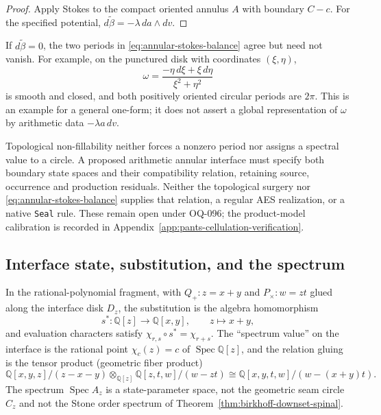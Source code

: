 \begin{proof}
Apply Stokes to the compact oriented annulus $A$ with boundary $C-c$.
For the specified potential, $d\widetilde\beta=-\lambda\,da\wedge dv$.
\end{proof}

\begin{remark}
\label{rem:annular-interface-open}
If $d\widetilde\beta=0$, the two periods in
\eqref{eq:annular-stokes-balance} agree but need not vanish.  For example, on
the punctured disk with coordinates $(\xi,\eta)$,
\[
 \omega=\frac{-\eta\,d\xi+\xi\,d\eta}{\xi^2+\eta^2}
\]
is smooth and closed, and both positively oriented circular periods are
$2\pi$.  This is an example for a general one-form; it does not assert a
global representation of $\omega$ by arithmetic data $-\lambda a\,dv$.

Topological non-fillability neither forces a nonzero period nor assigns a
spectral value to a circle.  A proposed arithmetic annular interface must
specify both boundary state spaces and their compatibility relation, retaining
source, occurrence and production residuals.  Neither the topological surgery
nor \eqref{eq:annular-stokes-balance} supplies that relation, a regular AES
realization, or a native \texttt{Seal} rule.  These remain open under OQ-096;
the product-model calibration is recorded in
Appendix~\ref{app:pants-cellulation-verification}.
\end{remark}

\subsection{Interface state, substitution, and the spectrum}

\begin{proposition}
\label{prop:polynomial-interface-spectrum}
In the rational-polynomial fragment, with $Q_+:z=x+y$ and $P_\times:w=zt$ glued
along the interface disk $D_z$, the substitution is the algebra homomorphism
\[
  s^*:\mathbb Q[z]\to\mathbb Q[x,y],\qquad z\mapsto x+y ,
\]
and evaluation characters satisfy $\chi_{r,s}\circ s^*=\chi_{r+s}$.  The
``spectrum value'' on the interface is the rational point $\chi_c(z)=c$ of
$\operatorname{Spec}\mathbb Q[z]$, and the relation gluing is the tensor product
(geometric fiber product)
\[
  \mathbb Q[x,y,z]/(z-x-y)\otimes_{\mathbb Q[z]}\mathbb Q[z,t,w]/(w-zt)
  \cong\mathbb Q[x,y,t,w]/(w-(x+y)t).
\]
The spectrum $\operatorname{Spec}A_z$ is a state-parameter space, not the
geometric seam circle $C_z$ and not the Stone order spectrum of
Theorem~\ref{thm:birkhoff-downset-spinal}.
\end{proposition}

